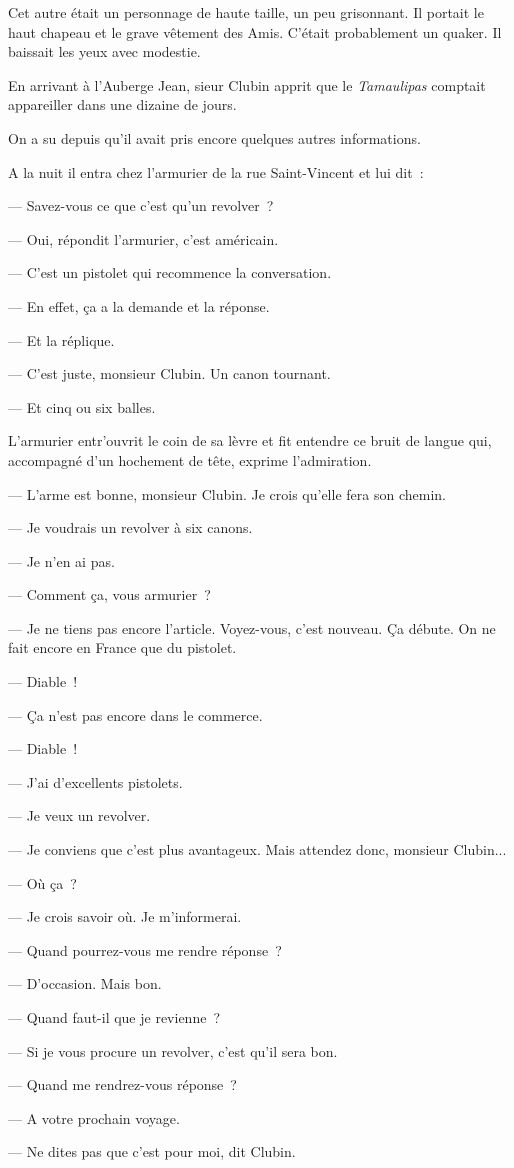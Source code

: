 \documentclass[french,twoside]{book} %
\begin{document}
Cet autre était un personnage de haute taille, un peu grisonnant. Il portait le haut chapeau et le grave  vêtement des Amis. C’était probablement un quaker. Il baissait les yeux avec modestie.\par
En arrivant à l’Auberge Jean, sieur Clubin apprit que le \emph{Tamaulipas} comptait appareiller dans une dizaine de jours.\par
On a su depuis qu’il avait pris encore quelques autres informations.\par
A la nuit il entra chez l’armurier de la rue Saint-Vincent et lui dit :\par
— Savez-vous ce que c’est qu’un revolver ?\par
— Oui, répondit l’armurier, c’est américain.\par
— C’est un pistolet qui recommence la conversation.\par
— En effet, ça a la demande et la réponse.\par
— Et la réplique.\par
— C’est juste, monsieur Clubin. Un canon tournant.\par
— Et cinq ou six balles.\par
L’armurier entr’ouvrit le coin de sa lèvre et fit entendre ce bruit de langue qui, accompagné d’un hochement de tête, exprime l’admiration.\par
— L’arme est bonne, monsieur Clubin. Je crois qu’elle fera son chemin.\par
— Je voudrais un revolver à six canons.\par
— Je n’en ai pas.\par
— Comment ça, vous armurier ?\par
— Je ne tiens pas encore l’article. Voyez-vous, c’est nouveau. Ça débute. On ne fait encore en France que du pistolet.\par
— Diable !\par
— Ça n’est pas encore dans le commerce.\par
 — Diable !\par
— J’ai d’excellents pistolets.\par
— Je veux un revolver.\par
— Je conviens que c’est plus avantageux. Mais attendez donc, monsieur Clubin...\par
— Où ça ?\par
— Je crois savoir où. Je m’informerai.\par
— Quand pourrez-vous me rendre réponse ?\par
— D’occasion. Mais bon.\par
— Quand faut-il que je revienne ?\par
— Si je vous procure un revolver, c’est qu’il sera bon.\par
— Quand me rendrez-vous réponse ?\par
— A votre prochain voyage.\par
— Ne dites pas que c’est pour moi, dit Clubin.
\end{document}
